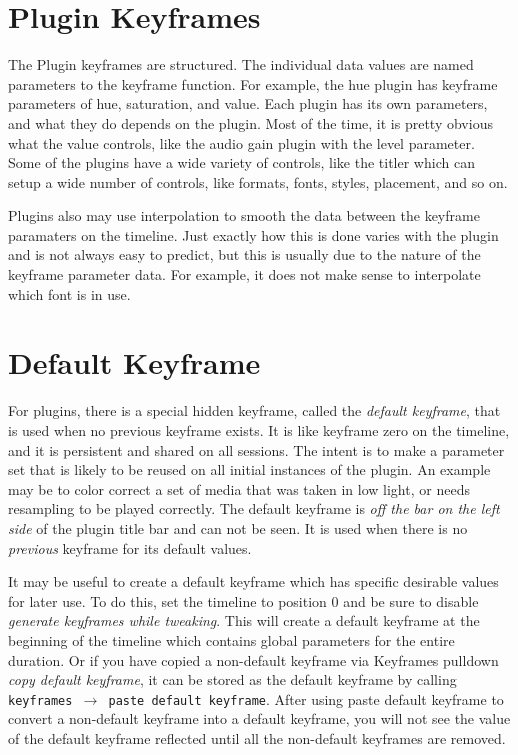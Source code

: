 \section{Plugin Keyframes}%
\label{sec:plugin_keyframe}

The Plugin keyframes are structured.  The individual data values are named parameters to the keyframe function.  For example, the hue plugin has keyframe parameters of hue, saturation, and value.  Each plugin has its own parameters, and what they do depends on the plugin.  Most of the time, it is pretty obvious what the value controls, like the audio gain plugin with the level parameter.  Some of the plugins have a wide variety of controls, like the titler which can setup a wide number of controls, like formats, fonts, styles, placement, and so on.

Plugins also may use interpolation to smooth the data between the keyframe paramaters on the timeline.  Just exactly how this is done varies with the plugin and is not always easy to predict, but this
is usually due to the nature of the keyframe parameter data.  For example, it does not make sense to interpolate which font is in use.

\section{Default Keyframe}%
\label{sec:default_keyframe}

For plugins, there is a special hidden keyframe, called the \textit{default keyframe}, that is used when no previous keyframe exists.  It is like keyframe zero on the timeline, and it is persistent and shared on
all sessions.  The intent is to make a parameter set that is likely to be reused on all initial instances of the plugin.  An example may be to color correct a set of media that was taken in low light, or needs resampling to be played correctly.  The default keyframe is \textit{off the bar on the left side} of the plugin title bar and can not be seen.  It is used when there is no \textit{previous} keyframe for its default values.

It may be useful to create a default keyframe which has specific desirable values for later use.  To do this, set the timeline to position 0 and be sure to disable \textit{generate keyframes while tweaking}.  This will create a default keyframe at the beginning of the timeline which contains global parameters for the entire duration.  Or if you have copied a non-default keyframe via Keyframes pulldown \textit{copy default keyframe}, it can be stored as the default keyframe by calling \texttt{keyframes $\rightarrow$ paste default keyframe}.  After using paste default keyframe to convert a non-default keyframe into a default keyframe, you will not see the value of the default keyframe reflected until all the non-default keyframes are removed.

